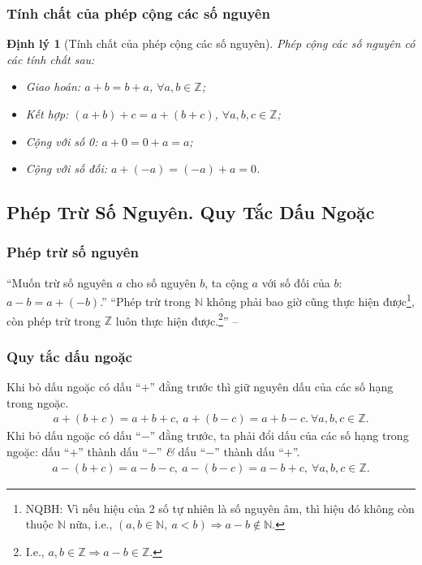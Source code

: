 \documentclass{article}
\numberwithin{equation}{section}
\newtheorem{theorem}{Định lý}[section]
\begin{document}
\subsubsection{Tính chất của phép cộng các số nguyên}

\begin{theorem}[Tính chất của phép cộng các số nguyên]
	Phép cộng các số nguyên có các tính chất sau:
	\begin{itemize}
		\item Giao hoán: $a + b = b + a$, $\forall a,b\in\mathbb{Z}$;
		\item Kết hợp: $(a + b) + c = a + (b + c)$, $\forall a,b,c\in\mathbb{Z}$;
		\item Cộng với số 0: $a + 0 = 0 + a = a$;
		\item Cộng với số đối: $a + (-a) = (-a) + a = 0$.
	\end{itemize}
\end{theorem}

\subsection{Phép Trừ Số Nguyên. Quy Tắc Dấu Ngoặc}

\subsubsection{Phép trừ số nguyên}
``Muốn trừ số nguyên $a$ cho số nguyên $b$, ta cộng $a$ với số đối của $b$: $a - b = a + (-b)$.'' ``Phép trừ trong $\mathbb{N}$ không phải bao giờ cũng thực hiện được\footnote{NQBH: Vì nếu hiệu của 2 số tự nhiên là số nguyên âm, thì hiệu đó không còn thuộc $\mathbb{N}$ nữa, i.e., $(a,b\in\mathbb{N},\ a < b)\Rightarrow a - b\notin\mathbb{N}$.}, còn phép trừ trong $\mathbb{Z}$ luôn thực hiện được.\footnote{I.e., $a,b\in\mathbb{Z}\Rightarrow a - b\in\mathbb{Z}$.}'' -- \cite[p. 76]{Thai_Anh_Dat_Ha_Loan_Nam_Quang_Toan_6_tap_1}

\subsubsection{Quy tắc dấu ngoặc}
Khi bỏ dấu ngoặc có dấu ``$+$'' đằng trước thì giữ nguyên dấu của các số hạng trong ngoặc.
\begin{align*}
	a + (b + c) = a + b + c,\ a + (b - c) = a + b - c.\ \forall a,b,c\in\mathbb{Z}.
\end{align*}
Khi bỏ dấu ngoặc có dấu ``$-$'' đằng trước, ta phải đổi dấu của các số hạng trong ngoặc: dấu ``$+$'' thành dấu ``$-$'' \textit{\&} dấu ``$-$'' thành dấu ``$+$''.
\begin{align*}
	a - (b + c) = a - b - c,\ a - (b - c) = a - b + c,\ \forall a,b,c\in\mathbb{Z}.
\end{align*}
\end{document}
